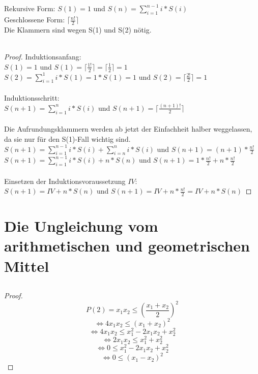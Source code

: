 \documentclass[10pt,ngerman]{article}
\begin{document}
	\subsection{}
	Rekursive Form: $S(1)=1$ und $S(n)=\sum_{i=1}^{n-1}i*S(i)$\\
	Geschlossene Form: $\lceil \frac{n!}{2}\rceil$
	\\Die Klammern sind wegen S(1) und S(2) nötig.
	\\\\
	\begin{proof}
	
	Induktionsanfang:\\
		$S(1)=1$ und $S(1)=\lceil \frac{1!}{2} \rceil = \lceil \frac{1}{2} \rceil = 1$\\	
	 $S(2)=\sum_{i=1}^{1}i*S(1)=1*S(1)=1$ und $S(2)=\lceil \frac{2!}{2} \rceil=1$\\\\
	 Induktionsschritt:\\
	 $S(n+1)=\sum_{i=1}^{n}i*S(i)$ und $S(n+1)=\lceil \frac{(n+1)!}{2}\rceil$\\\\
	 Die Aufrundungsklammern werden ab jetzt der Einfachheit halber weggelassen, da sie nur für den S(1)-Fall wichtig sind.\\
	 $S(n+1)=\sum_{i=1}^{n-1}i*S(i)+\sum_{i=n}^{n}i*S(i)$ und $S(n+1)=(n+1)* \frac{n!}{2}$\\
	 $S(n+1)=\sum_{i=1}^{n-1}i*S(i)+n*S(n)$ und $S(n+1)=1* \frac{n!}{2}+n* \frac{n!}{2}$\\\\
	 Einsetzen der Induktionsvoraussetzung $IV$:\\
	 $S(n+1)=IV+n*S(n)$ und $S(n+1)=IV+n*\frac{n!}{2}=IV+n*S(n)$
	\end{proof}
	\section{Die Ungleichung vom arithmetischen und geometrischen Mittel}
	
	\subsection{}
	\begin{proof}
	\[P(2)=x_1x_2 \leq (\frac{x_1+x_2}{2})^2\]
	\[ \Longleftrightarrow4x_1x_2 \leq (x_1+x_2)^2\]
	\[ \Longleftrightarrow4x_1x_2 \leq x_1^2-2x_1x_2+x_2^2\]
	\[ \Longleftrightarrow2x_1x_2 \leq x_1^2+x_2^2\]
	\[\Longleftrightarrow0 \leq x_1^2-2x_1x_2+x_2^2\]
	\[\Longleftrightarrow0 \leq (x_1-x_2)^2\]
\end{proof}
\end{document}
